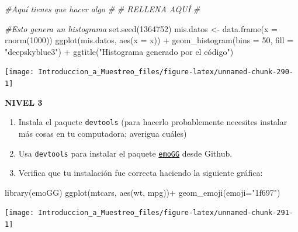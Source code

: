 \documentclass[
]{book}
\newenvironment{Shaded}{\begin{snugshade}}{\end{snugshade}}
\newcommand{\AttributeTok}[1]{\textcolor[rgb]{0.77,0.63,0.00}{#1}}
\newcommand{\CommentTok}[1]{\textcolor[rgb]{0.56,0.35,0.01}{\textit{#1}}}
\newcommand{\DecValTok}[1]{\textcolor[rgb]{0.00,0.00,0.81}{#1}}
\newcommand{\FunctionTok}[1]{\textcolor[rgb]{0.00,0.00,0.00}{#1}}
\newcommand{\NormalTok}[1]{#1}
\newcommand{\OtherTok}[1]{\textcolor[rgb]{0.56,0.35,0.01}{#1}}
\newcommand{\SpecialCharTok}[1]{\textcolor[rgb]{0.00,0.00,0.00}{#1}}
\newcommand{\StringTok}[1]{\textcolor[rgb]{0.31,0.60,0.02}{#1}}
\providecommand{\tightlist}{%
  \setlength{\itemsep}{0pt}\setlength{\parskip}{0pt}}
\begin{document}
\begin{Shaded}
\begin{Highlighting}[]
\CommentTok{\#Aquí tienes que hacer algo}
\CommentTok{\#}
\CommentTok{\# RELLENA AQUÍ}
\CommentTok{\#}

\CommentTok{\#Esto genera un histograma}
\FunctionTok{set.seed}\NormalTok{(}\DecValTok{1364752}\NormalTok{)}
\NormalTok{mis.datos }\OtherTok{\textless{}{-}} \FunctionTok{data.frame}\NormalTok{(}\AttributeTok{x =} \FunctionTok{rnorm}\NormalTok{(}\DecValTok{1000}\NormalTok{))}
\FunctionTok{ggplot}\NormalTok{(mis.datos, }\FunctionTok{aes}\NormalTok{(}\AttributeTok{x =}\NormalTok{ x)) }\SpecialCharTok{+} 
  \FunctionTok{geom\_histogram}\NormalTok{(}\AttributeTok{bins =} \DecValTok{50}\NormalTok{, }\AttributeTok{fill =} \StringTok{"deepskyblue3"}\NormalTok{) }\SpecialCharTok{+}
  \FunctionTok{ggtitle}\NormalTok{(}\StringTok{"Histograma generado por el código"}\NormalTok{)}
\end{Highlighting}
\end{Shaded}

\begin{center}\texttt{[image: Introduccion\_a\_Muestreo\_files/figure-latex/unnamed-chunk-290-1]} \end{center}

\textbf{NIVEL 3}

\begin{enumerate}
\def\labelenumi{\arabic{enumi}.}
\tightlist
\item
  Instala el paquete \texttt{devtools} (para hacerlo probablemente necesites instalar más cosas en tu computadora; averigua cuáles)
\item
  Usa \texttt{devtools} para instalar el paquete \href{https://github.com/dill/emoGG}{\texttt{emoGG}} desde Github.
\item
  Verifica que tu instalación fue correcta haciendo la siguiente gráfica:
\end{enumerate}

\begin{Shaded}
\begin{Highlighting}[]
\FunctionTok{library}\NormalTok{(emoGG)}
\FunctionTok{ggplot}\NormalTok{(mtcars, }\FunctionTok{aes}\NormalTok{(wt, mpg))}\SpecialCharTok{+} \FunctionTok{geom\_emoji}\NormalTok{(}\AttributeTok{emoji=}\StringTok{"1f697"}\NormalTok{)}
\end{Highlighting}
\end{Shaded}

\begin{center}\texttt{[image: Introduccion\_a\_Muestreo\_files/figure-latex/unnamed-chunk-291-1]} \end{center}
\end{document}
